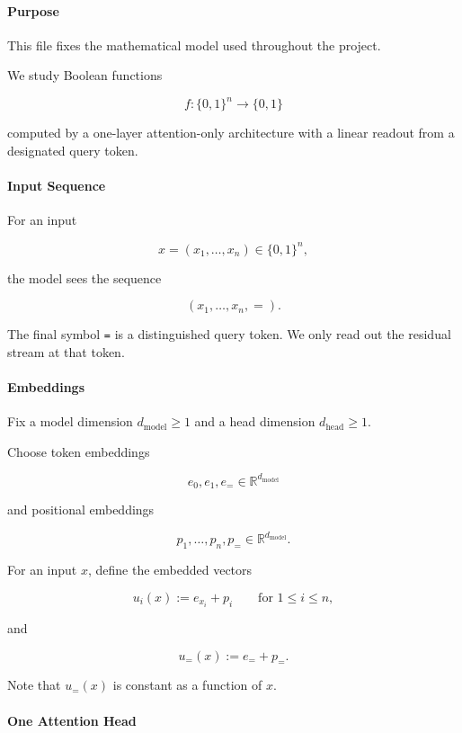 \documentclass{article}
\theoremstyle{definition}
\theoremstyle{plain}
\begin{document}
\begin{sourcebox}
\paragraph{Purpose}

This file fixes the mathematical model used throughout the project.

We study Boolean functions

\[f : \lbrace 0,1\rbrace^n \to \lbrace 0,1\rbrace\]

computed by a one-layer attention-only architecture with a linear readout from a designated query token.

\paragraph{Input Sequence}

For an input

\[x = (x_1, \ldots, x_n) \in \lbrace 0,1\rbrace^n,\]

the model sees the sequence

\[(x_1, \ldots, x_n, =).\]

The final symbol \texttt{=} is a distinguished query token. We only read out the residual stream at that token.

\paragraph{Embeddings}

Fix a model dimension $d_{\mathrm{model}} \geq 1$ and a head dimension $d_{\mathrm{head}} \geq 1$.

Choose token embeddings

\[e_0, e_1, e_= \in \mathbb{R}^{d_{\mathrm{model}}}\]

and positional embeddings

\[p_1, \ldots, p_n, p_= \in \mathbb{R}^{d_{\mathrm{model}}}.\]

For an input $x$, define the embedded vectors

\[u_i(x) := e_{x_i} + p_i \qquad \text{for } 1 \leq i \leq n,\]

and

\[u_=(x) := e_= + p_=.\]

Note that $u_=(x)$ is constant as a function of $x$.

\paragraph{One Attention Head}


\end{sourcebox}
\end{document}
